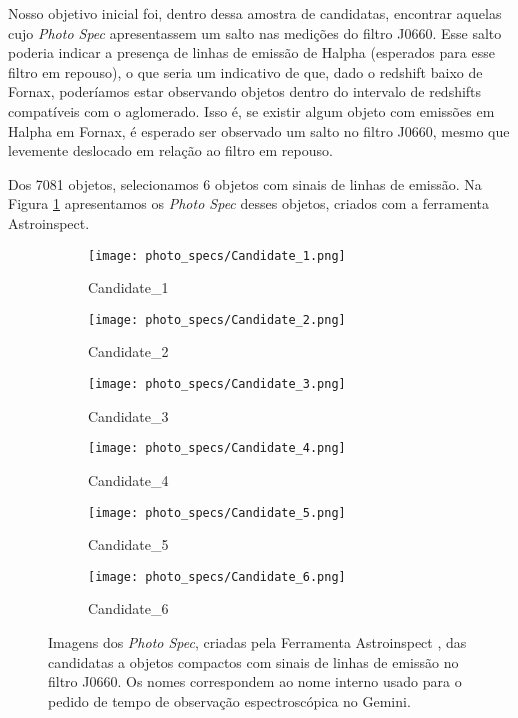 \vspace{\baselineskip}

Nosso objetivo inicial foi, dentro dessa amostra de candidatas, encontrar aquelas cujo \textit{Photo Spec} apresentassem um salto nas medições do filtro J0660. Esse salto poderia indicar a presença de linhas de emissão de Halpha (esperados para esse filtro em repouso), o que seria um indicativo de que, dado o redshift baixo de Fornax, poderíamos estar observando objetos dentro do intervalo de redshifts compatíveis com o aglomerado. Isso é, se existir algum objeto com emissões em Halpha em Fornax, é esperado ser observado um salto no filtro J0660, mesmo que levemente deslocado em relação ao filtro em repouso.

\vspace{\baselineskip}

Dos 7081 objetos, selecionamos 6 objetos com sinais de linhas de emissão. Na Figura \ref{photo_spec_candidatas} apresentamos os \textit{Photo Spec} desses objetos, criados com a ferramenta Astroinspect.


\begin{figure}[!ht]
    \centering
    \captionsetup{justification=centering}
    \begin{subfigure}[b]{0.3\textwidth}
        \texttt{[image: photo\_specs/Candidate\_1.png]}
        \caption{Candidate\_1}
    \end{subfigure}
    \begin{subfigure}[b]{0.3\textwidth}
        \texttt{[image: photo\_specs/Candidate\_2.png]}
        \caption{Candidate\_2}
    \end{subfigure}
    \begin{subfigure}[b]{0.3\textwidth}
        \texttt{[image: photo\_specs/Candidate\_3.png]}
        \caption{Candidate\_3}
    \end{subfigure}
    \begin{subfigure}[b]{0.3\textwidth}
        \texttt{[image: photo\_specs/Candidate\_4.png]}
        \caption{Candidate\_4}
    \end{subfigure}
    \begin{subfigure}[b]{0.3\textwidth}
        \texttt{[image: photo\_specs/Candidate\_5.png]}
        \caption{Candidate\_5}
    \end{subfigure}
    \begin{subfigure}[b]{0.3\textwidth}
        \texttt{[image: photo\_specs/Candidate\_6.png]}
        \caption{Candidate\_6}
    \end{subfigure}
    \caption{Imagens dos \textit{Photo Spec}, criadas pela Ferramenta Astroinspect \cite{astroinspect}, das candidatas a objetos compactos com sinais de linhas de emissão no filtro J0660. Os nomes correspondem ao nome interno usado para o pedido de tempo de observação espectroscópica no Gemini.}
    \label{photo_spec_candidatas}
\end{figure}


